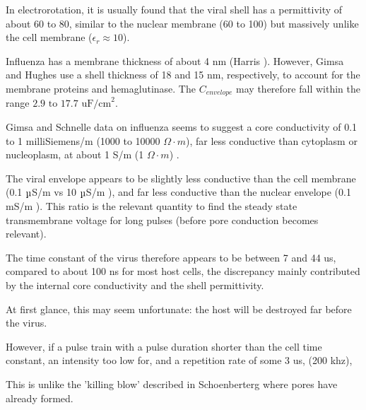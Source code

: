 \documentclass[fleqn,10pt]{article}
\begin{document}
In electrorotation, it is usually found that the viral shell has a permittivity of about 60 to 80, similar to the nuclear membrane (60 to 100) but massively unlike the cell membrane ($\epsilon_r\approx 10$). 

Influenza has a membrane thickness of about 4 nm (Harris \cite{Influenza2006}). However, Gimsa and Hughes use a shell thickness of 18 and 15 nm, respectively, to account for the membrane proteins and hemaglutinase. The $C_{envelope}$ may therefore fall within the range $2.9 \text{ to } 17.7 \text{ uF/cm}^2$.


Gimsa and Schnelle data on influenza seems to suggest a core conductivity of 0.1 to 1 milliSiemens/m (1000 to 10000 $\Omega \cdot m$), far less conductive than cytoplasm or nucleoplasm, at about 1 S/m (1 $\Omega \cdot m$) \cite{Study2001}.

The viral envelope appears to be slightly less conductive than the cell membrane (0.1 $\micro$S/m \cite{New1999} vs 10 $\micro$S/m \cite{Study2001}), and far less conductive than the nuclear envelope (0.1 $\text{m}$S/m \cite{Study2001}). This ratio is the relevant quantity to find the steady state transmembrane voltage for long pulses (before pore conduction becomes relevant).

The time constant of the virus therefore appears to be between 7 and 44 us, compared to about 100 ns for most host cells, the discrepancy mainly contributed by the internal core conductivity and the shell permittivity.

At first glance, this may seem unfortunate: the host will be destroyed far before the virus.

However, if a pulse train with a pulse duration shorter than the cell time constant, an intensity too low for, and a repetition rate of some 3 us, (200 khz), 

This is unlike the 'killing blow' described in Schoenberterg where pores have already formed.


















\end{document}

